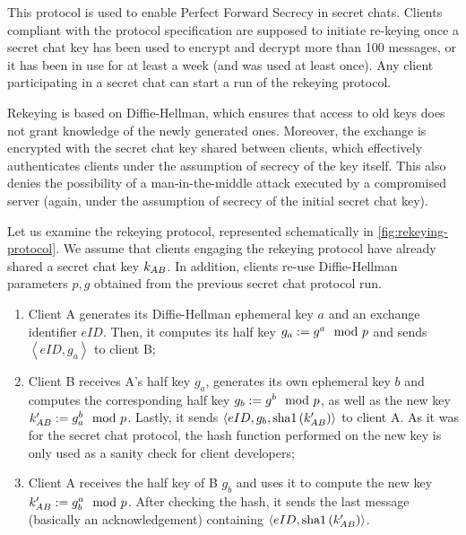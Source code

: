 This protocol is used to enable Perfect Forward Secrecy in secret chats. Clients compliant with the protocol specification are supposed to initiate re-keying once a secret chat key has been used to encrypt and decrypt more than 100 messages, or it has been in use for at least a week (and was used at least once). Any client participating in a secret chat can start a run of the rekeying protocol.

Rekeying is based on Diffie-Hellman, which ensures that access to old keys does not grant knowledge of the newly generated ones. Moreover, the exchange is encrypted with the secret chat key shared between clients, which effectively authenticates clients under the assumption of secrecy of the key itself. This also denies the possibility of a man-in-the-middle attack executed by a compromised server (again, under the assumption of secrecy of the initial secret chat key).

Let us examine the rekeying protocol, represented schematically in \cref{fig:rekeying-protocol}. We assume that clients engaging the rekeying protocol have already shared a secret chat key $k_{AB}$. In addition, clients re-use Diffie-Hellman parameters $p, g$ obtained from the previous secret chat protocol run.

\begin{enumerate}
    \item{Client A generates its Diffie-Hellman ephemeral key $a$ and an exchange identifier $eID$. Then, it computes its half key $g_a:= g^a \mod{p}$ and sends $\left<eID, g_a\right>$ to client B;}
    \item{Client B receives A's half key $g_a$, generates its own ephemeral key $b$ and computes the corresponding half key $g_b:= g^b \mod{p}$, as well as the new key $k'_{AB}:= g_a^b \mod{p}$. Lastly, it sends $\left<eID, g_b, \mbox{sha1}\left(k'_{AB}\right)\right>$ to client A. As it was for the secret chat protocol, the hash function performed on the new key is only used as a sanity check for client developers;}
    \item{Client A receives the half key of B $g_b$ and uses it to compute the new key $k'_{AB}:= g_b^a \mod{p}$. After checking the hash, it sends the last message (basically an acknowledgement) containing $\left<eID, \mbox{sha1}\left(k'_{AB}\right)\right>$.}
\end{enumerate}